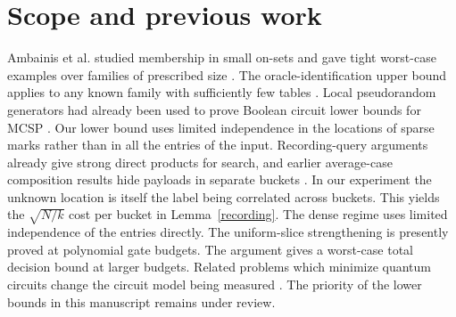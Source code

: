 \documentclass[11pt]{article}
\begin{document}
\section{Scope and previous work}
Ambainis et al. studied membership in small on-sets and gave tight worst-case examples over families of prescribed size \cite{smallsets}. The oracle-identification upper bound applies to any known family with sufficiently few tables \cite{kothari}. Local pseudorandom generators had already been used to prove Boolean circuit lower bounds for MCSP \cite{cklm}. Our lower bound uses limited independence in the locations of sparse marks rather than in all the entries of the input. Recording-query arguments already give strong direct products for search, and earlier average-case composition results hide payloads in separate buckets \cite{hm,belovs}. In our experiment the unknown location is itself the label being correlated across buckets. This yields the $\sqrt{N/k}$ cost per bucket in Lemma~\ref{recording}. The dense regime uses limited independence of the entries directly. The uniform-slice strengthening is presently proved at polynomial gate budgets. The argument gives a worst-case total decision bound at larger budgets. Related problems which minimize quantum circuits change the circuit model being measured \cite{qmcsp}. The priority of the lower bounds in this manuscript remains under review.
\end{document}
